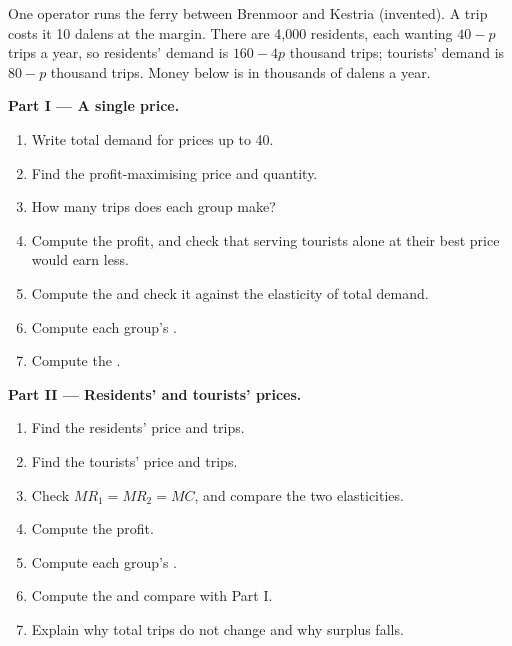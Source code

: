 \begin{problem}\label{pb:b1:monopoly-pricing:ferry}
One operator runs the ferry between Brenmoor and Kestria (invented). A trip
costs it 10 dalens at the margin. There are 4,000 residents, each wanting
$40 - p$ trips a year, so residents' demand is $160 - 4p$ thousand trips;
tourists' demand is $80 - p$ thousand trips. Money below is in thousands of
dalens a year.

\medskip\noindent\textbf{Part I --- A single price.}
\begin{enumerate}
  \item Write total demand for prices up to 40.
  \item Find the profit-maximising price and quantity.
  \item How many trips does each group make?
  \item Compute the profit, and check that serving tourists alone at their best price would earn less.
  \item Compute the  and check it against the elasticity of total demand.
  \item Compute each group's .
  \item Compute the .
\end{enumerate}

\medskip\noindent\textbf{Part II --- Residents' and tourists' prices.}
\begin{enumerate}[resume]
  \item Find the residents' price and trips.
  \item Find the tourists' price and trips.
  \item Check $MR_1 = MR_2 = MC$, and compare the two elasticities.
  \item Compute the profit.
  \item Compute each group's .
  \item Compute the  and compare with Part I.
  \item Explain why total trips do not change and why surplus falls.
\end{enumerate}


\end{problem}
